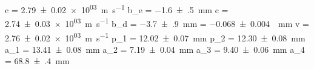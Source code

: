 c = \SI{+2.79(2)e+03}{\meter\per\second}
b_e = \SI{-1.6(5)}{\milli\meter}
c = \SI{+2.74(3)e+03}{\meter\per\second}
b_d = \SI{-3.7(9)}{\milli\meter}
\alpha = \SI{-0.068(4)}{\per\milli\meter}
v = \SI{+2.76(2)e+03}{\meter\per\second}
p_1 = \SI{+12.02(7)}{\milli\meter}
p_2 = \SI{+12.30(8)}{\milli\meter}
a_1 = \SI{+13.41(8)}{\milli\meter}
a_2 = \SI{+7.19(4)}{\milli\meter}
a_3 = \SI{+9.40(6)}{\milli\meter}
a_4 = \SI{+68.8(4)}{\milli\meter}
